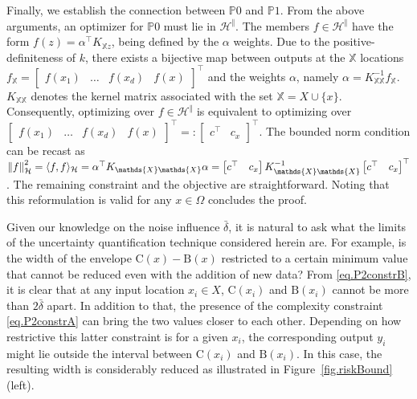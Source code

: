 \begin{my_proof}
	Finally, we establish the connection between $\mathds{P}0$ and $\mathds{P}1$. From the above arguments, an optimizer for $\mathds{P}0$ must lie in $\mathcal{H}^\Vert$. The members $f \in \mathcal{H}^\Vert$ have the form $f(z) = \alpha^\top K_{\mathds{X}z}$, being defined by the $\alpha$ weights. Due to the positive-definiteness of $k$, there exists a bijective map between outputs at the $\mathds{X}$ locations $f_{\mathds{X}} = \begin{bmatrix} f(x_1) & \dots & f(x_d) & f(x) \end{bmatrix}^\top$ and the weights $\alpha$, namely $\alpha = K_{\mathds{X}\mathds{X}}^{-1}f_{\mathds{X}}$. $K_{\mathds{X}\mathds{X}}$ denotes the kernel matrix associated with the set $\mathds{X} = X \cup \{x\}$. Consequently, optimizing over $f \in \mathcal{H}^\Vert$ is equivalent to optimizing over $\begin{bmatrix} f(x_1) & \dots & f(x_d) & f(x) \end{bmatrix}^\top =: \begin{bmatrix}c^\top & c_x\end{bmatrix}^\top$. The bounded norm condition can be recast as $\rknorm{f}^2 = \rkinner{f}{f} = \alpha^\top K_{\mathds{X}\mathds{X}} \alpha = \begin{bmatrix}c^\top & c_x\end{bmatrix} K_{\mathds{X}\mathds{X}}^{-1} \begin{bmatrix}c^\top & c_x\end{bmatrix}^\top$. The remaining constraint and the objective are straightforward. Noting that this reformulation is valid for any $x \in \Omega$ concludes the proof. 
\end{my_proof}


Given our knowledge on the noise influence $\bar \delta$, it is natural to ask what the limits of the uncertainty quantification technique considered herein are. For example, is the width of the envelope $\text{C}(x) - \text{B}(x)$ restricted to a certain minimum value that cannot be reduced even with the addition of new data? From \eqref{eq.P2constrB}, it is clear that at any input location $x_i \in X$, $\text{C}(x_i)$ and $\text{B}(x_i)$ cannot be more than $2\bar \delta$ apart. In addition to that, the presence of the complexity constraint \eqref{eq.P2constrA} can bring the two values closer to each other. Depending on how restrictive this latter constraint is for a given $x_i$, the corresponding output $y_i$ might lie outside the interval between $\text{C}(x_i)$ and $\text{B}(x_i)$. In this case, the resulting width is considerably reduced as illustrated in Figure~\ref{fig.riskBound} (left).

